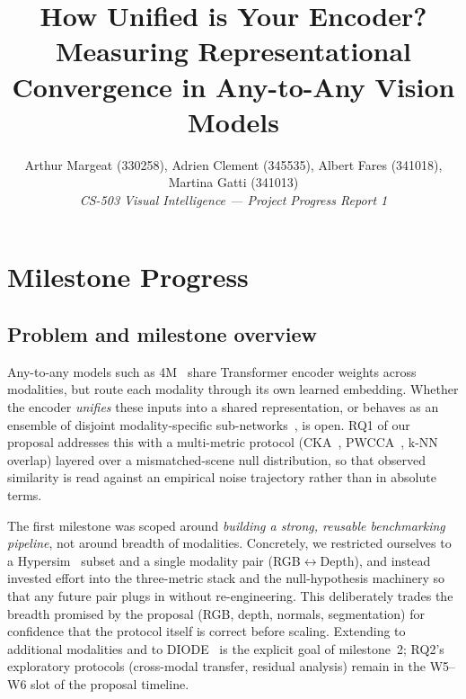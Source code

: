 \documentclass[10pt,conference,compsocconf]{IEEEtran}
\begin{document}
\title{How Unified is Your Encoder?\\ Measuring Representational Convergence in Any-to-Any Vision Models}

\author{
  Arthur Margeat (330258), Adrien Clement (345535),
  Albert Fares (341018), Martina Gatti (341013)\\
  \textit{CS-503 Visual Intelligence --- Project Progress Report 1}
}

\maketitle

\section{Milestone Progress}

\subsection{Problem and milestone overview}
Any-to-any models such as 4M~\cite{4m} share Transformer encoder
weights across modalities, but route each modality through its own
learned embedding. Whether the encoder \emph{unifies} these inputs
into a shared representation, or behaves as an ensemble of disjoint
modality-specific sub-networks~\cite{zamir}, is open. RQ1 of our
proposal addresses this with a multi-metric protocol (CKA~\cite{cka},
PWCCA~\cite{pwcca}, k-NN overlap) layered over a mismatched-scene
null distribution, so that observed similarity is read against an
empirical noise trajectory rather than in absolute terms.

The first milestone was scoped around
\emph{building a strong, reusable benchmarking pipeline}, not around
breadth of modalities. Concretely, we restricted ourselves to a
Hypersim~\cite{hypersim} subset and a single modality pair
(RGB$\leftrightarrow$Depth), and instead invested effort into the
three-metric stack and the null-hypothesis machinery so that any
future pair plugs in without re-engineering. This deliberately trades
the breadth promised by the proposal (RGB, depth, normals,
segmentation) for confidence that the protocol itself is correct
before scaling. Extending to additional modalities and to
DIODE~\cite{diode} is the explicit goal of milestone~2; RQ2's
exploratory protocols (cross-modal transfer, residual analysis)
remain in the W5--W6 slot of the proposal timeline.
\end{document}
